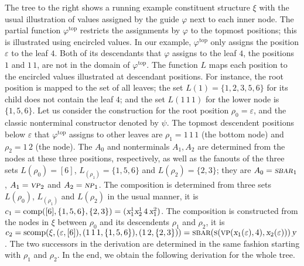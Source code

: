 \documentclass[../../document.tex]{subfiles}
\begin{document}
    \begin{wrapfigure}[8]{r}{0pt}
        
    \end{wrapfigure}
    \parexample\label{ex:extraction:head}
    The tree to the right shows a running example constituent structure \(\xi\) with the usual illustration of values assigned by the guide \(\varphi\) next to each inner node.
    The partial function \(\varphi^{\text{top}}\) restricts the assignments by \(\varphi\) to the topmost positions; this is illustrated using encircled values.
    In our example, \(\varphi^{\text{top}}\) only assigns the position \(\varepsilon\) to the leaf \(4\).
    Both of its descendants that \(\varphi\) assigns to the leaf \(4\), the positions \(1\) and \(1\,1\), are not in the domain of \(\varphi^{\text{top}}\).
    The function \(L\) maps each position to the encircled values illustrated at descendant positions.
    For instance, the root position is mapped to the set of all leaves; the set \(L(1) = \{1,2,3,5,6\}\) for its child does not contain the leaf $4$; and the set \(L(1\,1\,1)\) for the lower  node is \(\{1,5,6\}\).
    Let us consider the construction for the root position \(\rho_0 = \varepsilon\), and the classic nonterminal constructor denoted by \(\psi\).
    The topmost descendent positions below \(\varepsilon\) that \(\varphi^{\text{top}}\) assigns to other leaves are \(\rho_1 = 1\,1\,1\) (the bottom  node) and \(\rho_2 = 1\,2\) (the  node).
    The  \(A_0\) and  nonterminals \(A_1, A_2\) are determined from the nodes at these three positions, respectively, as well as the fanouts of the three sets \(L(\rho_0) = [6]\), \(L_(\rho_1) = \{1,5,6\}\) and \(L(\rho_2) = \{2,3\}\); they are \(A_0 = \textsc{\textsl{sbar}}_1\), \(A_1 = \textsc{\textsl{vp}}_2\) and \(A_2 = \textsc{\textsl{np}}_1\).
    The  composition is determined from three sets \(L(\rho_0)\), \(L_(\rho_1)\) and \(L(\rho_2)\) in the usual manner, it is \(c_1 = \mathrm{comp}([6], \{1,5,6\}, \{2,3\}) = (\textsl{x}_1^1\textsl{x}_2^1\,4\,\textsl{x}_1^2)\).
    The  composition is constructed from the nodes in \(\xi\) between \(\rho_0\) and its descendents \(\rho_1\) and \(\rho_2\), it is \(c_2 = \mathrm{scomp}(\xi, (\varepsilon, [6]), (1\,1\,1, \{1,5,6\}), (1\,2, \{2,3\})) = \textsc{sbar}(\textsc{s}(\textsc{vp}(\textsl{x}_1(\varepsilon), 4), \textsl{x}_2(\varepsilon)))\,\textsl{y}\).
    The two successors in the derivation are determined in the same fashion starting with \(\rho_1\) and \(\rho_2\).
    In the end, we obtain the following derivation for the whole tree.
    \begin{center}
        
    \end{center}
    \exampleqed
\end{document}
